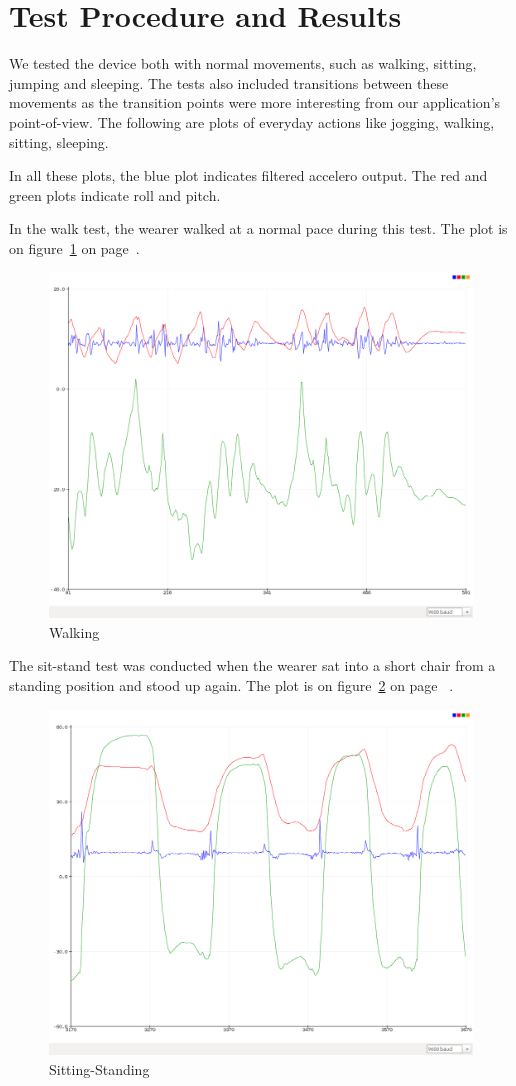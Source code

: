 \documentclass[11pt, a4paper]{article}
\begin{document}
\section{Test Procedure and Results}
We tested the device both with normal movements, such as walking, sitting,
jumping and sleeping. The tests also included transitions between these
movements as the transition points were more interesting from our
application's point-of-view. The following are plots of everyday actions
like jogging, walking, sitting, sleeping.

\noindent In all these plots, the blue plot indicates filtered accelero
output.  The red and green plots indicate roll and pitch.

\noindent In the walk test, the wearer walked at a normal pace during this
test. The plot is on figure~\ref{fig:walk} on page~\pageref{fig:walk}.
\begin{figure}
    \centering
    \includegraphics[width=0.7\linewidth]{walk.png}
    \caption{Walking}
    \label{fig:walk}
\end{figure}

\noindent The sit-stand test was conducted when the wearer sat into a short chair from a
standing position and stood up again. The plot is on figure~\ref{fig:ss} on page
~\pageref{fig:ss}.
\begin{figure}
    \centering
    \includegraphics[width=0.7\linewidth]{sit-stand.png}
    \caption{Sitting-Standing}
    \label{fig:ss}
\end{figure}
\end{document}
